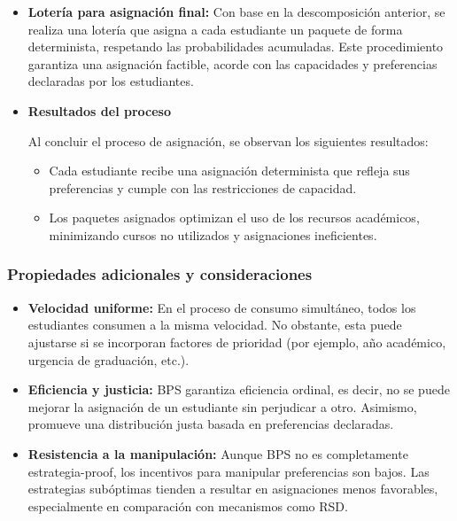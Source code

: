 \documentclass{article}
\begin{document}
\begin{itemize}
    \item \textbf{Lotería para asignación final:} Con base en la descomposición anterior, se realiza una lotería que asigna a cada estudiante un paquete de forma determinista, respetando las probabilidades acumuladas. Este procedimiento garantiza una asignación factible, acorde con las capacidades y preferencias declaradas por los estudiantes.

    \item \textbf{Resultados del proceso}

    Al concluir el proceso de asignación, se observan los siguientes resultados:
    
    \begin{itemize}
        \item Cada estudiante recibe una asignación determinista que refleja sus preferencias y cumple con las restricciones de capacidad.
        
        \item Los paquetes asignados optimizan el uso de los recursos académicos, minimizando cursos no utilizados y asignaciones ineficientes.
    \end{itemize}

  \end{itemize}

\subsubsection{Propiedades adicionales y consideraciones}

\begin{itemize}
    \item \textbf{Velocidad uniforme:} En el proceso de consumo simultáneo, todos los estudiantes consumen a la misma velocidad. No obstante, esta puede ajustarse si se incorporan factores de prioridad (por ejemplo, año académico, urgencia de graduación, etc.).

    \item \textbf{Eficiencia y justicia:} BPS garantiza eficiencia ordinal, es decir, no se puede mejorar la asignación de un estudiante sin perjudicar a otro. Asimismo, promueve una distribución justa basada en preferencias declaradas.

    \item \textbf{Resistencia a la manipulación:} Aunque BPS no es completamente estrategia-proof, los incentivos para manipular preferencias son bajos. Las estrategias subóptimas tienden a resultar en asignaciones menos favorables, especialmente en comparación con mecanismos como RSD.
\end{itemize}
\end{document}
